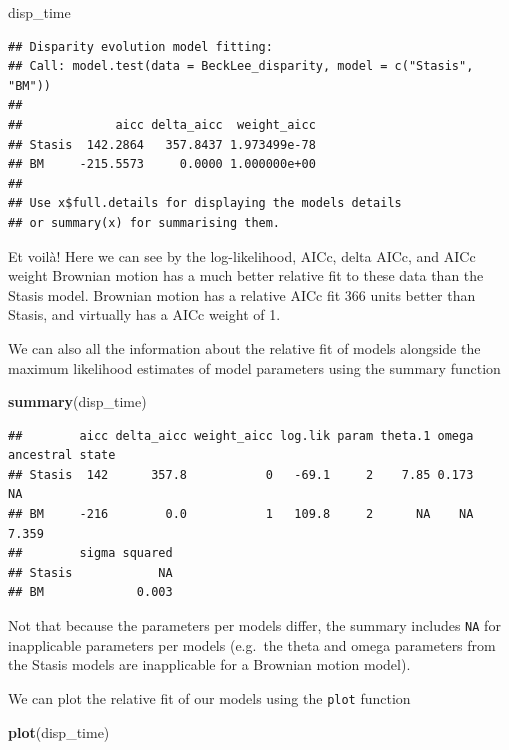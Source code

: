 \documentclass[]{book}
\newenvironment{Shaded}{\begin{snugshade}}{\end{snugshade}}
\newcommand{\KeywordTok}[1]{\textcolor[rgb]{0.13,0.29,0.53}{\textbf{#1}}}
\newcommand{\NormalTok}[1]{#1}
\begin{document}
\begin{Shaded}
\begin{Highlighting}[]
\NormalTok{disp_time}
\end{Highlighting}
\end{Shaded}

\begin{verbatim}
## Disparity evolution model fitting:
## Call: model.test(data = BeckLee_disparity, model = c("Stasis", "BM")) 
## 
##             aicc delta_aicc  weight_aicc
## Stasis  142.2864   357.8437 1.973499e-78
## BM     -215.5573     0.0000 1.000000e+00
## 
## Use x$full.details for displaying the models details
## or summary(x) for summarising them.
\end{verbatim}

Et voilà! Here we can see by the log-likelihood, AICc, delta AICc, and AICc weight Brownian motion has a much better relative fit to these data than the Stasis model.
Brownian motion has a relative AICc fit 366 units better than Stasis, and virtually has a AICc weight of 1.

We can also all the information about the relative fit of models alongside the maximum likelihood estimates of model parameters using the summary function

\begin{Shaded}
\begin{Highlighting}[]
\KeywordTok{summary}\NormalTok{(disp_time)}
\end{Highlighting}
\end{Shaded}

\begin{verbatim}
##        aicc delta_aicc weight_aicc log.lik param theta.1 omega ancestral state
## Stasis  142      357.8           0   -69.1     2    7.85 0.173              NA
## BM     -216        0.0           1   109.8     2      NA    NA           7.359
##        sigma squared
## Stasis            NA
## BM             0.003
\end{verbatim}

Not that because the parameters per models differ, the summary includes \texttt{NA} for inapplicable parameters per models (e.g.~the theta and omega parameters from the Stasis models are inapplicable for a Brownian motion model).

We can plot the relative fit of our models using the \texttt{plot} function

\begin{Shaded}
\begin{Highlighting}[]
\KeywordTok{plot}\NormalTok{(disp_time)}
\end{Highlighting}
\end{Shaded}
\end{document}
